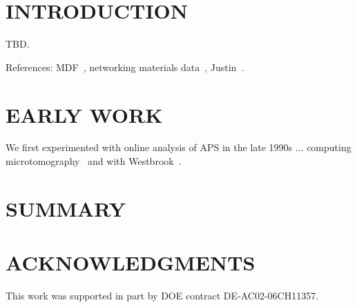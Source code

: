 \documentclass{aip-cp}
\newcommand\ian[1]{}
\newcommand\ian[1]{{\color{red}[Ian: #1]}}
\begin{document}
\section{INTRODUCTION}

\ian{Potential authors: Ben Blaiszik, Kyle Chard, Ryan Chard, Logan Ward, Justin Wozniak, ...}

TBD.


References: MDF~\cite{MDF2016}, networking materials data~\cite{foster2015networking}, Justin~\cite{wozniak2015big}.

\section{EARLY WORK}

We first experimented with online analysis of APS in the late 1990s ...
computing microtomography~\cite{wang1999quasi,wang2001high} and with Westbrook~\cite{von2000using}.













\section{SUMMARY}





\section{ACKNOWLEDGMENTS}

This work was supported in part by DOE contract DE-AC02-06CH11357.


\nocite{*}
%
%
\end{document}
